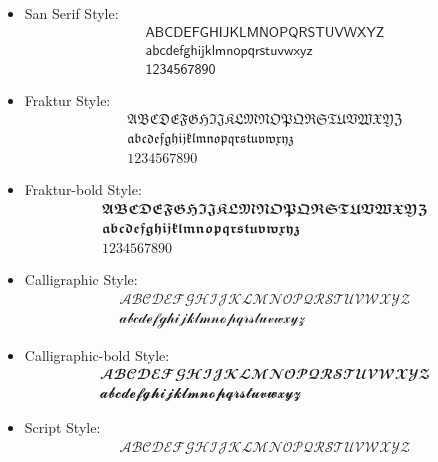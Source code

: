 \documentclass[
thesis.tex
]{subfiles}
\begin{document}
\begin{itemize}
	
	\item San Serif Style: 
	\begin{gather*}
		\mathsf{
			A B C D E F G H I J K L M N O P Q R S T U V W X Y Z
		}\\
		\mathsf{
			a b c d e f g h i j k l m n o p q r s t u v w x y z
		}\\
		\mathsf{
			1 2 3 4 5 6 7 8 9 0
		}
	\end{gather*}
	
	\item Fraktur Style: 
	\begin{gather*}
		\mathfrak{
			A B C D E F G H I J K L M N O P Q R S T U V W X Y Z
		}\\
		\mathfrak{
			a b c d e f g h i j k l m n o p q r s t u v w x y z
		}\\
		\mathfrak{
			1 2 3 4 5 6 7 8 9 0
		}
	\end{gather*}
	
	\item Fraktur-bold Style: 
	\begin{gather*}
		\mathbffrak{
			A B C D E F G H I J K L M N O P Q R S T U V W X Y Z
		}\\
		\mathbffrak{
			a b c d e f g h i j k l m n o p q r s t u v w x y z
		}\\
		\mathbffrak{
			1 2 3 4 5 6 7 8 9 0
		}
	\end{gather*}
	
	\item Calligraphic Style: 
	\begin{gather*}
		\mathcal{
			A B C D E F G H I J K L M N O P Q R S T U V W X Y Z
		}\\
		\mathcal{
			a b c d e f g h i j k l m n o p q r s t u v w x y z
		}
	\end{gather*}
	
	\item Calligraphic-bold Style: 
	\begin{gather*}
		\mathbfcal{
			A B C D E F G H I J K L M N O P Q R S T U V W X Y Z
		}\\
		\mathbfcal{
			a b c d e f g h i j k l m n o p q r s t u v w x y z
		}
	\end{gather*}
	
	\item Script Style: 
	\begin{gather*}
		\mathscr{
			A B C D E F G H I J K L M N O P Q R S T U V W X Y Z
		}
	\end{gather*}
	

\end{itemize}
\end{document}
